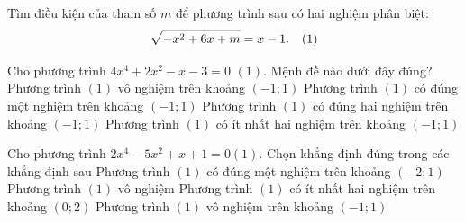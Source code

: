 \begin{bt}%
		Tìm điều kiện của tham số $m$ để phương trình sau có hai nghiệm phân biệt:
		$$
		\sqrt{-x^2+6x+m}=x-1. \quad \hfill (1)
		$$
		 
	\end{bt}

\begin{ex}%
	Cho phương trình $4x^4+2x^2-x-3=0$ $(1)$.  Mệnh đề nào dưới đây đúng?
	\choice 
		{Phương trình $(1)$ vô nghiệm  trên khoảng $\left(-1; 1\right)$}
		{Phương trình $(1)$ có đúng một nghiệm trên  khoảng $\left(-1; 1\right)$}
		{Phương trình $(1)$ có  đúng hai nghiệm trên khoảng $\left(-1; 1\right)$}
		{\True Phương trình $(1)$ có ít  nhất hai nghiệm trên khoảng $\left(-1; 1\right)$}
\end{ex}

\begin{ex}%
	Cho phương trình $2x^4-5x^2+x+1=0(1)$. Chọn khẳng định  đúng trong các khẳng định sau
	 \choice
		{Phương  trình $(1)$ có đúng một nghiệm trên khoảng $\left(-2; 1\right)$}
		{Phương trình $(1)$ vô nghiệm} 
		{\True Phương trình $(1)$ có ít  nhất hai nghiệm trên khoảng $\left(0; 2\right)$}
		{Phương  trình $(1)$ vô nghiệm trên khoảng $\left(-1; 1\right)$}
\end{ex}

